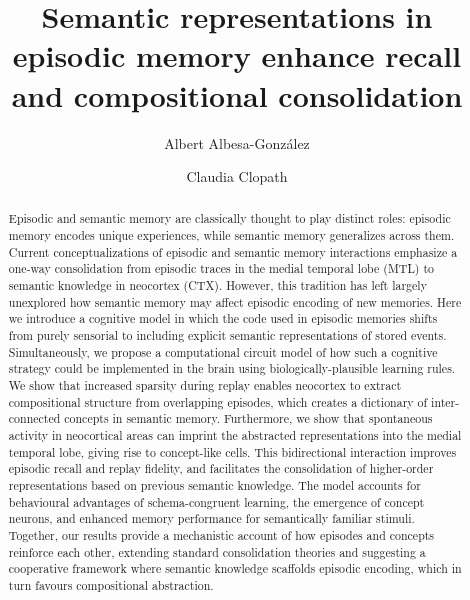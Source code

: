 \documentclass{article}
\title{Semantic representations in episodic memory enhance recall and compositional consolidation}
\author[1]{Albert Albesa-González}
\author[1]{Claudia Clopath}
\affil[1]{Department of Bioengineering, Imperial College London, London, UK}
\begin{document}
\maketitle
\begin{abstract}
\noindent Episodic and semantic memory are classically thought to play distinct roles: episodic memory encodes unique experiences, while semantic memory generalizes across them. Current conceptualizations of episodic and semantic memory interactions emphasize a one-way consolidation from episodic traces in the medial temporal lobe (MTL) to semantic knowledge in neocortex (CTX). However, this tradition has left largely unexplored how semantic memory may affect episodic encoding of new memories. Here we introduce a cognitive model in which the code used in episodic memories shifts from purely sensorial to including explicit semantic representations of stored events. Simultaneously, we propose a computational circuit model of how such a cognitive strategy could be implemented in the brain using biologically-plausible learning rules. We show that increased sparsity during replay enables neocortex to extract compositional structure from overlapping episodes, which creates a dictionary of inter-connected concepts in semantic memory. Furthermore, we show that spontaneous activity in neocortical areas can imprint the abstracted representations into the medial temporal lobe, giving rise to concept-like cells. This bidirectional interaction improves episodic recall and replay fidelity, and  facilitates the consolidation of higher-order representations based on previous semantic knowledge. The model accounts for behavioural advantages of schema-congruent learning, the emergence of concept neurons, and enhanced memory performance for semantically familiar stimuli. Together, our results provide a mechanistic account of how episodes and concepts reinforce each other, extending standard consolidation theories and suggesting a cooperative framework where semantic knowledge scaffolds episodic encoding, which in turn favours compositional abstraction.
\end{abstract}
\end{document}
